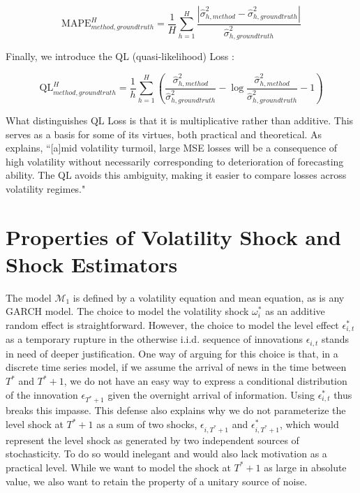 \documentclass[11pt]{article}
\def\mc#1{\mathcal{#1}} %
\def\mc#1{\mathcal{#1}}
\theoremstyle{definition}
\begin{document}
\[ 
\text{MAPE}^{H}_{method, ground truth} = \frac{1}{H}\sum_{h=1}^{H}\frac{|\hat\sigma^{2}_{h, method} - \hat\sigma^{2}_{h, ground truth}|}{\hat\sigma^{2}_{h, ground truth}}
\]

Finally, we introduce the QL (quasi-likelihood) Loss \citep{brownlees2011practical}:

\[ 
\text{QL}^{H}_{method, ground truth} = \frac{1}{h}\sum_{h=1}^{H} (\frac{ \hat\sigma^{2}_{h, method} }{\hat\sigma^{2}_{h, ground truth}} - \log{\frac{ \hat\sigma^{2}_{h, method} }{\hat\sigma^{2}_{h, ground truth}}} -1)
\]

What distinguishes QL Loss is that it is multiplicative rather than additive.  This serves as a basis for some of its virtues, both practical and theoretical.  As \citet{brownlees2011practical} explains, ``[a]mid volatility turmoil, large MSE
losses will be a consequence of high volatility without necessarily corresponding to
deterioration of forecasting ability. The QL avoids this ambiguity, making it easier to
compare losses across volatility regimes."

\section{Properties of Volatility Shock and Shock Estimators}

The model $\mc{M}_1$ is defined by a volatility equation and mean equation, as is any GARCH model.  The choice to model the volatility shock $\omega^{*}_{i}$ as an additive random effect is straightforward.  However, the choice to model the level effect $\epsilon^{*}_{i,t}$ as a temporary rupture in the otherwise i.i.d. sequence of innovations $\epsilon_{i,t}$ stands in need of deeper justification.  One way of arguing for this choice is that, in a discrete time series model, if we assume the arrival of news in the time between $T^{*}$ and $T^{*}+1$, we do not have an easy way to express a conditional distribution of the innovation $\epsilon_{T^{*}+1}$ given the overnight arrival of information.  Using $\epsilon^{*}_{i,t}$ thus breaks this impasse.  This defense also explains why we do not parameterize the level shock at $T^{*}+1$ as a sum of two shocks, $\epsilon_{i,T^{*}+1}$ and $\epsilon^{*}_{i,T^{*}+1}$, which would represent the level shock as generated by two independent sources of stochasticity.  To do so would inelegant and would also lack motivation as a practical level.  While we want to model the shock at $T^{*}+1$ as large in absolute value, we also want to retain the property of a unitary source of noise.
\end{document}
